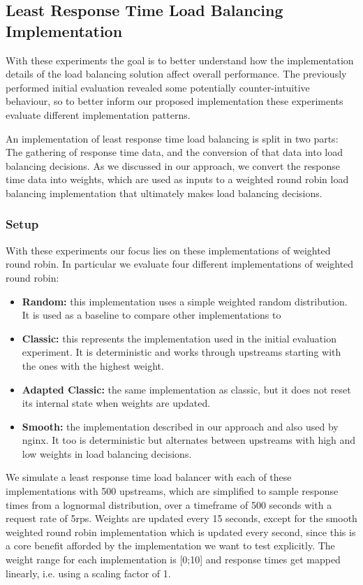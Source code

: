 \subsection{Least Response Time Load Balancing Implementation}
With these experiments the goal is to better understand how the implementation details of the load balancing solution affect overall performance.
The previously performed initial evaluation revealed some potentially counter-intuitive behaviour, so to better inform our proposed implementation these experiments evaluate different implementation patterns.

An implementation of least response time load balancing is split in two parts: The gathering of response time data, and the conversion of that data into load balancing decisions.
As we discussed in our approach, we convert the response time data into weights, which are used as inputs to a weighted round robin load balancing implementation that ultimately makes load balancing decisions.
\subsubsection{Setup}
With these experiments our focus lies on these implementations of weighted round robin.
In particular we evaluate four different implementations of weighted round robin:
\begin{itemize}
    \item \textbf{Random:} this implementation uses a simple weighted random distribution. It is used as a baseline to compare other implementations to
    \item \textbf{Classic:} this represents the implementation used in the initial evaluation experiment\cite{wrr-kblinux}. It is deterministic and works through upstreams starting with the ones with the highest weight.
    \item \textbf{Adapted Classic:} the same implementation as classic, but it does not reset its internal state when weights are updated. 
    \item \textbf{Smooth:} the implementation described in our approach and also used by nginx\cite{nginx-wrr}. It too is deterministic but alternates between upstreams with high and low weights in load balancing decisions.
\end{itemize}

We simulate a least response time load balancer with each of these implementations with 500 upstreams, which are simplified to sample response times from a lognormal distribution, over a timeframe of 500 seconds with a request rate of 5\gls{rps}.
Weights are updated every 15 seconds, except for the smooth weighted round robin implementation which is updated every second, since this is a core benefit afforded by the implementation we want to test explicitly.
The weight range for each implementation is [0;10] and response times get mapped linearly, i.e. using a scaling factor of 1.


